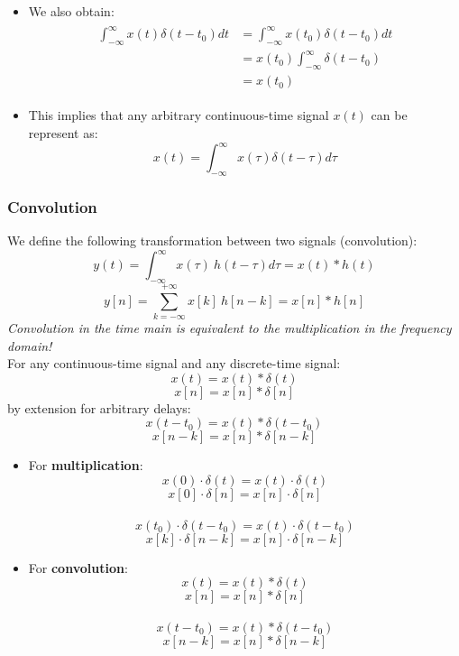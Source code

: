  \begin{itemize}
\item We also obtain:
\begin{align*}\begin{split}
\int_{-\infty}^{\infty} x(t)\delta(t-t_{0})dt &= \int_{-\infty}^{\infty} x(t_{0})\delta(t-t_{0})dt \\
&= x(t_{0})\int_{-\infty}^{\infty} \delta(t-t_{0})\\
&= x(t_{0}) 
\end{split}
\end{align*}
\item This implies that any arbitrary continuous-time signal $x(t)$ can be represent as:
\[ x(t) = \int_{-\infty}^{\infty} x(\tau)\delta(t-\tau)d\tau \]
\end{itemize}

\subsubsection{Convolution}
We define the following transformation between two signals (convolution):
\[ y(t) = \int_{-\infty}^{\infty} x(\tau) \ h(t-\tau)d\tau = x(t)*h(t) \]
\[ y[n] = \sum_{k=-\infty}^{+\infty}x[k] \ h[n-k] = x[n]*h[n] \]
\textit{Convolution in the time main is equivalent to the multiplication in the frequency domain!} \\

For any continuous-time signal and any discrete-time signal:
\[ x(t) = x(t) * \delta(t) \]
\[ x[n] = x[n] * \delta[n] \]
by extension for arbitrary delays:
\[ x(t-t_{0}) = x(t) * \delta(t-t_{0}) \]
\[ x[n-k] = x[n] * \delta[n-k] \]

\begin{tcolorbox}[title=Summary of properties of the unit impulse, breakable]
 \begin{itemize}
  \item For \textbf{multiplication}:
   \[ x(0)\cdot \delta(t) = x(t)\cdot \delta(t) \]
   \[ x[0]\cdot \delta[n] = x[n]\cdot \delta[n] \]
\ \\ 
   \[ x(t_{0})\cdot \delta(t-t_{0}) = x(t)\cdot \delta(t-t_{0}) \]
   \[ x[k]\cdot \delta[n-k] = x[n] \cdot \delta[n-k] \]
  \item For \textbf{convolution}:
   \[ x(t) = x(t)*\delta(t) \]
   \[ x[n] = x[n]*\delta[n] \]
\ \\
   \[  x(t-t_{0}) = x(t)* \delta(t-t_{0}) \]
   \[ x[n-k] = x[n]*\delta[n-k] \]
 \end{itemize}
\end{tcolorbox} 